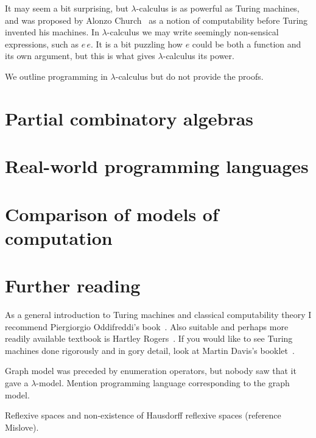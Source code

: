 It may seem a bit surprising, but $\lambda$-calculus is as powerful as
Turing machines, and was proposed by Alonzo Church~\cite{church} as a
notion of computability before Turing invented his machines. In
$\lambda$-calculus we may write seemingly non-sensical expressions,
such as $e\, e$. It is a bit puzzling how $e$ could be both a function
and its own argument, but this is what gives $\lambda$-calculus its
power.

We outline programming in $\lambda$-calculus but do not provide the
proofs.



\section{Partial combinatory algebras}
\label{sec:pcas}


\section{Real-world programming languages}
\label{sec:programming-languages}


\section{Comparison of models of computation}
\label{sec:models-comparison}



\section{Further reading}
\label{sec:models-further-reading}

As a general introduction to Turing machines and classical
computability theory I recommend Piergiorgio Oddifreddi's
book~\cite{Oddifreddi}. Also suitable and perhaps more readily
available textbook is Hartley Rogers~\cite{Rogers}. If you would like
to see Turing machines done rigorously and in gory detail, look at
Martin Davis's booklet~\cite{Davis}.


Graph model was preceded by enumeration operators, but nobody saw that
it gave a $\lambda$-model. Mention programming language corresponding
to the graph model.

Reflexive spaces and non-existence of Hausdorff reflexive spaces
(reference Mislove).


